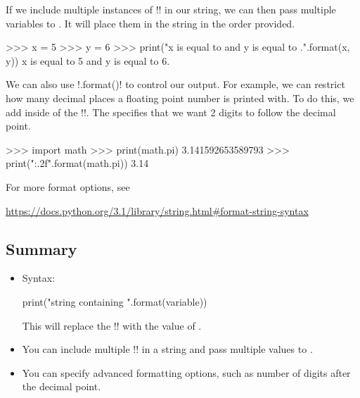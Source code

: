 \documentclass[11pt]{cselabheader}
\begin{document}
If we include multiple instances of \pythoninline!{}! in our string, we can then
pass multiple variables to . It will place them in the
string in the order provided.

\begin{pyconcode}
>>> x = 5
>>> y = 6
>>> print("x is equal to {} and y is equal to {}.".format(x, y))
x is equal to 5 and y is equal to 6.
\end{pyconcode}

We can also use \pythoninline!.format()! to control our output. For example, we
can restrict how many decimal places a floating point number is printed with. To
do this, we add  inside of the \pythoninline!{}!. The
 specifies that we want 2 digits to follow the decimal point.

\begin{pyconcode}
>>> import math
>>> print(math.pi)
3.141592653589793
>>> print("{:.2f}".format(math.pi))
3.14
\end{pyconcode}

For more format options, see
\begin{center}
  \vspace{-2mm}
  \url{https://docs.python.org/3.1/library/string.html#format-string-syntax}
  \vspace{-2mm}
\end{center}

\subsection{Summary}

\begin{itemize}
  \item Syntax:
    \begin{python3code}
print("string containing {}".format(variable))
    \end{python3code}

    This will replace the \pythoninline!{}! with the value of
    .

  \item You can include multiple \pythoninline!{}! in a string and pass multiple
    values to .

  \item You can specify advanced formatting options, such as number of digits
    after the decimal point.
\end{itemize}
\end{document}
